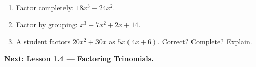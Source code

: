\documentclass[aspectratio=169, 11pt]{beamer}
\begin{document}
\begin{frame}[t, plain]
  \begin{enumerate}
    \setlength{\itemsep}{0.35cm}
    \item Factor completely: $18x^3-24x^2$.
    \item Factor by grouping: $x^3+7x^2+2x+14$.
    \item A student factors $20x^2+30x$ as $5x(4x+6)$. Correct? Complete? Explain.
  \end{enumerate}
  \vspace{0.3cm}
  {\color{royal}\bfseries Next: Lesson 1.4 --- Factoring Trinomials.}
\end{frame}
\end{document}
